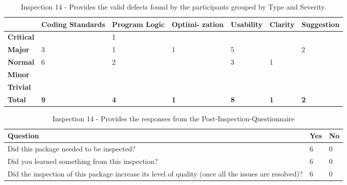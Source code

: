 \begin{table}[!h]
  \begin{center}
    \caption[Inspection 14 - Results by Type and Severity]{Inspection 14 -
      Provides the valid defects found by the participants grouped by Type
      and Severity.}
    \label{tab:inspection-results-14-type}
    \begin{tabular}{|p{2.0cm}|p{1.7cm}|p{1.5cm}|p{1.7cm}|p{1.4cm}|p{1.4cm}|p{1.5cm}|}  \hline   
\small{} & \small{}{\bf Coding Standards} & 
\small{}{\bf Program Logic} & \small{} {\bf Optimi- zation} & 
\small{}{\bf Usability} & \small{} {\bf Clarity} & 
\small{} {\bf Suggestion} \\ \hline

{\bf Critical} &   & 1 &   &   &   &   \\ \hline
{\bf Major}    & 3 & 1 & 1 & 5 &   & 2 \\ \hline
{\bf Normal}   & 6 & 2 &   & 3 & 1 &   \\ \hline
{\bf Minor}    &   &   &   &   &   &   \\ \hline
{\bf Trivial}  &   &   &   &   &   &   \\ \hline

{\bf Total} & {\bf 9} & {\bf 4} & {\bf 1} & {\bf 8} & {\bf 1} & {\bf 2} \\ \hline
    \end{tabular}
  \end{center}
\end{table}



\begin{table}[!h]
  \begin{center}
    \caption[Post Inspection 14 - Responses]{Inspection 14 - Provides the
      responses from the Post-Inspection-Questionnaire}
    \label{tab:post-inspection-questionnaire-results-14}
    \begin{tabular}{|p{8.0cm}|p{2.5cm}|p{2.5cm}|} \hline
{\bf Question} & {\bf Yes} & {\bf No} \\ \hline
Did this package needed to be inspected?  & 6 & 0 \\ \hline
Did you learned something from this inspection?  & 6 & 0 \\ \hline
Did the inspection of this package increase its level of quality (once all
the issues are resolved)? & 6 & 0 \\ \hline
    \end{tabular}
  \end{center}
\end{table}


